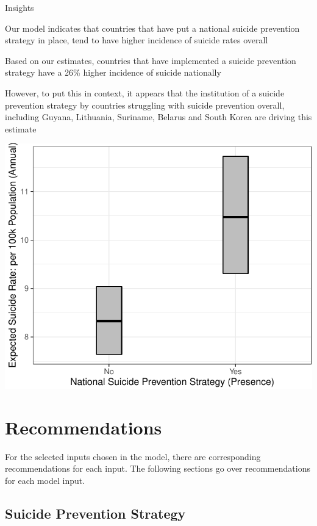 \documentclass[]{article}
\begin{document}
Insights

Our model indicates that countries that have put a national suicide
prevention strategy in place, tend to have higher incidence of suicide
rates overall

Based on our estimates, countries that have implemented a suicide
prevention strategy have a 26\% higher incidence of suicide nationally

However, to put this in context, it appears that the institution of a
suicide prevention strategy by countries struggling with suicide
prevention overall, including Guyana, Lithuania, Suriname, Belarus and
South Korea are driving this estimate

\begin{center}\includegraphics{Project_Report_files/figure-latex/sstrat_plot-1} \end{center}

\section{Recommendations}\label{recommendations}

For the selected inputs chosen in the model, there are corresponding
recommendations for each input. The following sections go over
recommendations for each model input.

\subsection{Suicide Prevention
Strategy}\label{suicide-prevention-strategy}
\end{document}

